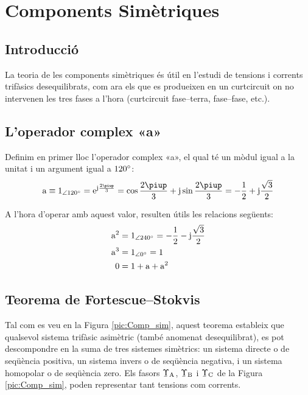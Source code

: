 \chapter{Components Simètriques}  \label{sec:comp-sim}

\section{Introducció}
La teoria de les components simètriques és útil en l'estudi de
tensions i corrents trifàsics
 desequilibrats, com ara els que es produeixen en un curtcircuit on no intervenen les tres
 fases a l'hora (curtcircuit fase--terra, fase--fase, etc.).

\section{L'operador complex «a»}

Definim en primer lloc l'operador complex «a», el qual té un mòdul
igual a la unitat i un argument igual a $120^\circ$: 
\begin{equation}
   \au \equiv \numpd{1}{120} = \eu^{\ju\frac{2\piup}{3}} =
   \cos \frac{2\piup}{3} + \ju \sin \frac{2\piup}{3} = - \frac{1}{2} + \ju \frac{\sqrt{3}}{2}
\end{equation}

A l'hora d'operar amb aquest valor, resulten útils les relacions
següents:
\begin{subequations}
\begin{align}
    \mathrm{a}^2 &= \num{1}_{\angle\ang{240}}= - \frac{1}{2} - \mathrm{j} \frac{\sqrt{3}}{2} \\
    \mathrm{a}^3 &= \num{1}_{\angle\ang{0}} = 1 \\
    0 &= 1+ \mathrm{a} + \mathrm{a}^2
 \end{align}
\end{subequations}

\section{\texorpdfstring{Teorema de Fortescue--Stokvis}{Teorema de Fortescue-Stokvis}}

Tal com es veu en la Figura \vref{pic:Comp_sim}, aquest teorema
estableix que qualsevol sistema trifàsic asimètric (també anomenat
desequilibrat),  es pot descompondre  en la suma de tres sistemes
simètrics: un sistema directe o de seqüència positiva, un sistema
invers o de seqüència negativa, i un sistema homopolar o de
seqüència zero. Els fasors $\cmplx{\Upsilon}\ped{A}$,
$\cmplx{\Upsilon}\ped{B}$ i $\cmplx{\Upsilon}\ped{C}$ de la Figura \vref{pic:Comp_sim}, poden representar tant
tensions com corrents.

